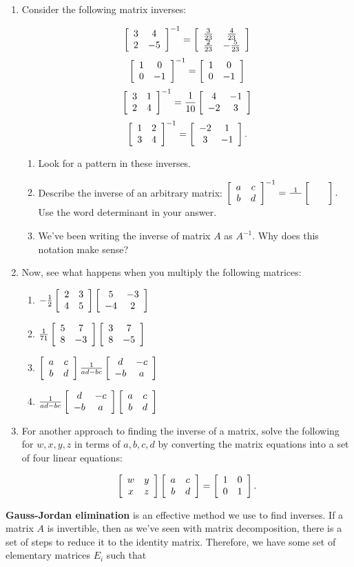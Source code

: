 \documentclass[../gatm.tex]{subfiles}
\begin{document}
\begin{enumerate}
\setcounter{enumi}{\value{problem_i}}
\item Consider the following matrix inverses:

$$\left[\begin{array}{cc} 3 & 4 \\ 2 & -5 \end{array}\right]^{-1}=\left[\begin{array}{cc} \frac{3}{23} & \frac{4}{23} \\ \frac{2}{23} & -\frac{5}{23} \end{array}\right]$$
$$\left[\begin{array}{cc} 1 & 0 \\ 0 & -1 \end{array}\right]^{-1}=\left[\begin{array}{cc} 1 & 0 \\ 0 & -1 \end{array}\right]$$
$$\left[\begin{array}{cc} 3 & 1 \\ 2 & 4 \end{array}\right]^{-1}=\frac{1}{10}\left[\begin{array}{cc} 4 & -1 \\ -2 & 3 \end{array}\right]$$
$$\left[\begin{array}{cc} 1 & 2 \\ 3 & 4 \end{array}\right]^{-1} = \left[\begin{array}{cc} -2 & 1 \\ 3 & -1 \end{array}\right].$$

\begin{enumerate}
\item Look for a pattern in these inverses.
\item Describe the inverse of an arbitrary matrix: $\left[\begin{array}{cc} a & c \\ b & d \end{array}\right]^{-1}=\frac{1}{\phantom{egg}}\left[\begin{array}{cc}  &  \\  &  \end{array}\right].$ Use the word determinant in your answer.
\item We've been writing the inverse of matrix $A$ as $A^{-1}$. Why does this notation make sense?
\end{enumerate}
\item Now, see what happens when you multiply the following matrices:
\begin{multicols}{2}
\begin{enumerate}
\item $-\frac{1}{2}\left[\begin{array}{cc} 2 & 3 \\ 4 & 5 \end{array}\right]\left[\begin{array}{cc} 5 & -3 \\ -4 & 2 \end{array}\right]$
\item $\frac{1}{71}\left[\begin{array}{cc} 5 & 7 \\ 8 & -3 \end{array}\right]\left[\begin{array}{cc} 3 & 7 \\ 8 & -5 \end{array}\right]$
\item $\left[\begin{array}{cc} a & c \\ b & d \end{array}\right]\frac{1}{ad-bc}\left[\begin{array}{cc} d & -c \\ -b & a \end{array}\right]$
\item $\frac{1}{ad-bc}\left[\begin{array}{cc} d & -c \\ -b & a \end{array}\right]\left[\begin{array}{cc} a & c \\ b & d \end{array}\right]$
\end{enumerate}
\end{multicols}
\item For another approach to finding the inverse of a matrix, solve the following for $w,x,y,z$ in terms of $a,b,c,d$ by converting the matrix equations into a set of four linear equations:

$$\left[\begin{array}{cc} w & y \\ x & z \end{array}\right]\left[\begin{array}{cc} a & c \\ b & d \end{array}\right]=\left[\begin{array}{cc} 1 & 0 \\ 0 & 1 \end{array}\right].$$
\setcounter{problem_i}{\value{enumi}}
\end{enumerate}

\noindent\textbf{Gauss-Jordan elimination} is an effective method we use to find inverses. If a matrix $A$ is invertible, then as we've seen with matrix decomposition, there is a set of steps to reduce it to the identity matrix. Therefore, we have some set of elementary matrices $E_i$ such that
\end{document}
